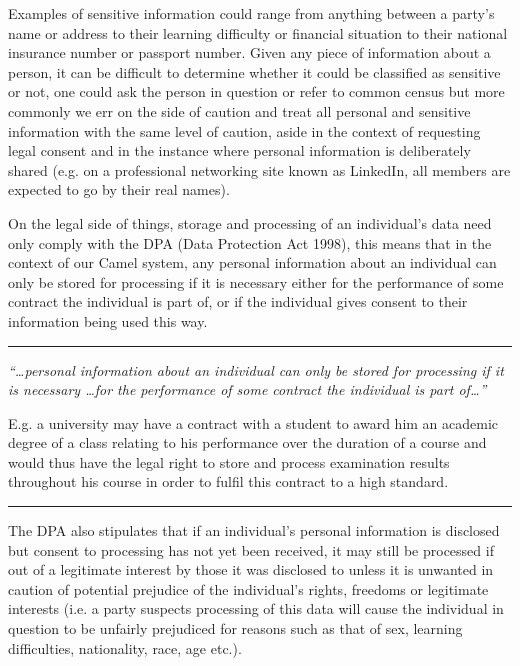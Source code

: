     Examples of sensitive information could range from anything between a party’s name or address to their learning difficulty or financial situation to their national insurance number or passport number. Given any piece of information about a person, it can be difficult to determine whether it could be classified as sensitive or not, one could ask the person in question or refer to common census but more commonly we err on the side of caution and treat all personal and sensitive information with the same level of caution, aside in the context of requesting legal consent and in the instance where personal information is deliberately shared (e.g. on a professional networking site known as LinkedIn, all members are expected to go by their real names).
    
    On the legal side of things, storage and processing of an individual’s data need only comply with the DPA (Data Protection Act 1998), this means that in the context of our Camel system, any personal information about an individual can only be stored for processing if it is necessary either for the performance of some contract the individual is part of, or if the individual gives consent to their information being used this way.\cite{DPA:tDPP:S1}\cite{DPA:tDPP:S2}
    
    \vspace{0.35cm}
    \hrule
    {\raggedright \small \em “\ldots personal information about an individual can only be stored for processing if it is necessary \ldots for the performance of some contract the individual is part of…” \par} 
    {\raggedleft \scriptsize E.g. a university may have a contract with a student to award him an academic degree of a class relating to his performance over the duration of a course and would thus have the legal right to store and process examination results throughout his course in order to fulfil this contract to a high standard. \par}
    \vspace{0.35cm}
    \hrule

    The DPA also stipulates that if an individual’s personal information is disclosed but consent to processing has not yet been received, it may still be processed if out of a legitimate interest by those it was disclosed to unless it is unwanted in caution of potential prejudice of the individual’s rights, freedoms or legitimate interests\cite{DPA:tDPP:S2} (i.e. a party suspects processing of this data will cause the individual in question to be unfairly prejudiced for reasons such as that of sex, learning difficulties, nationality, race, age etc.).

